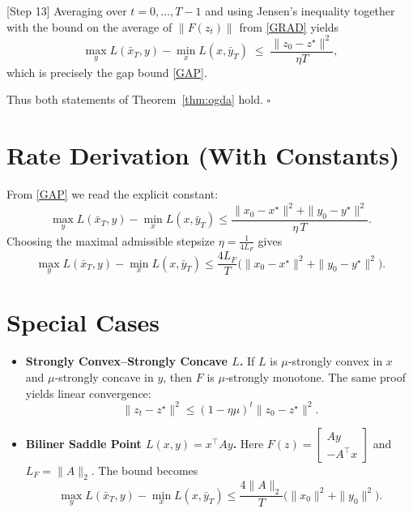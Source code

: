 \documentclass{article}
\begin{document}
[Step 13] Averaging over $t=0,\dots,T-1$ and using Jensen’s inequality together with the bound on the average of $\|F(z_{t})\|$ from \eqref{GRAD} yields
\[
\max_{y}L(\bar x_{T},y)-\min_{x}L(x,\bar y_{T})
\;\le\;
\frac{\|z_{0}-z^{\star}\|^{2}}{\eta T},
\tag{Step 13}
\]
which is precisely the gap bound \eqref{GAP}.

Thus both statements of Theorem~\ref{thm:ogda} hold. $\square$

\section*{Rate Derivation (With Constants)}
From \eqref{GAP} we read the explicit constant:
\[
\boxed{
\displaystyle
\max_{y}L(\bar x_{T},y)-\min_{x}L(x,\bar y_{T})
\le
\frac{\|x_{0}-x^{\star}\|^{2}+\|y_{0}-y^{\star}\|^{2}}{\eta\,T}.
}
\]
Choosing the maximal admissible stepsize $\eta = \frac{1}{4L_{F}}$ gives
\[
\max_{y}L(\bar x_{T},y)-\min_{x}L(x,\bar y_{T})
\le
\frac{4L_{F}}{T}\bigl(\|x_{0}-x^{\star}\|^{2}+\|y_{0}-y^{\star}\|^{2}\bigr).
\]

\section*{Special Cases}
\begin{itemize}
\item \textbf{Strongly Convex–Strongly Concave $L$.} If $L$ is $\mu$‑strongly convex in $x$ and $\mu$‑strongly concave in $y$, then $F$ is $\mu$‑strongly monotone. The same proof yields linear convergence:
\[
\|z_{t}-z^{\star}\|^{2}\le (1-\eta\mu)^{t}\|z_{0}-z^{\star}\|^{2}.
\]
\item \textbf{Biliner Saddle Point $L(x,y)=x^{\top}Ay$.} Here $F(z) = \begin{bmatrix}Ay\\-A^{\top}x\end{bmatrix}$ and $L_{F}=\|A\|_{2}$. The bound becomes
\[
\max_{y}L(\bar x_{T},y)-\min_{x}L(x,\bar y_{T})
\le
\frac{4\|A\|_{2}}{T}\bigl(\|x_{0}\|^{2}+\|y_{0}\|^{2}\bigr).
\]
\end{itemize}
\end{document}
